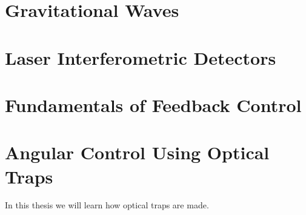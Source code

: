 \section{Gravitational Waves}

\section{Laser Interferometric Detectors}

\section{Fundamentals of Feedback Control}

\section{Angular Control Using Optical Traps}

In this thesis we will learn how optical traps are made.


